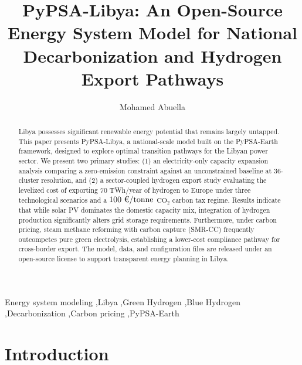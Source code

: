 \documentclass[preprint,12pt]{elsarticle}
\begin{document}
\begin{frontmatter}

\title{PyPSA-Libya: An Open-Source Energy System Model for National Decarbonization and Hydrogen Export Pathways}

\author{Mohamed Abuella}



\begin{abstract}
Libya possesses significant renewable energy potential that remains largely untapped. This paper presents PyPSA-Libya, a national-scale model built on the PyPSA-Earth framework, designed to explore optimal transition pathways for the Libyan power sector. We present two primary studies: (1) an electricity-only capacity expansion analysis comparing a zero-emission constraint against an unconstrained baseline at 36-cluster resolution, and (2) a sector-coupled hydrogen export study evaluating the levelized cost of exporting 70 TWh/year of hydrogen to Europe under three technological scenarios and a $100\text{~\texteuro/tonne}$ $\text{CO}_2$ carbon tax regime. Results indicate that while solar PV dominates the domestic capacity mix, integration of hydrogen production significantly alters grid storage requirements. Furthermore, under carbon pricing, steam methane reforming with carbon capture (SMR-CC) frequently outcompetes pure green electrolysis, establishing a lower-cost compliance pathway for cross-border export. The model, data, and configuration files are released under an open-source license to support transparent energy planning in Libya.
\end{abstract}

\begin{keyword}
Energy system modeling \sep Libya \sep Green Hydrogen \sep Blue Hydrogen \sep Decarbonization \sep Carbon pricing \sep PyPSA-Earth
\end{keyword}

\end{frontmatter}

\section{Introduction}
\label{sec:introduction}
\end{document}
